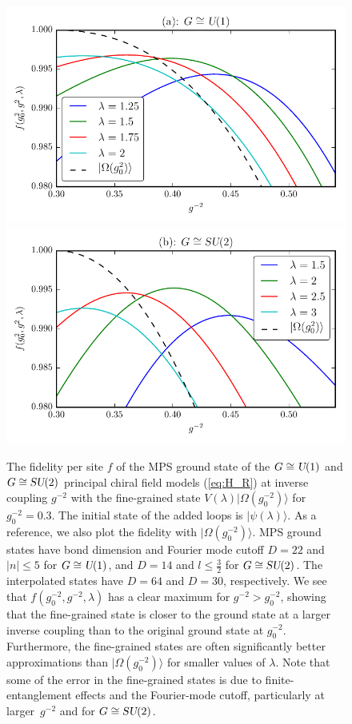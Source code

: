 \documentclass[twocolumn,lengthcheck,superscriptaddress]{revtex4-1}
\def\su2{\textsl{SU}(2)}
\def\uone{\textsl{U}(1)}
\theoremstyle{definition}
\theoremstyle{remark}
\begin{document}
\begin{figure}[ht]
  \includegraphics[width=0.48\linewidth]{interpfidu1.pdf}
  \includegraphics[width=0.48\linewidth]{interpfidsu2.pdf}
  \caption{\label{fig:interp-fid} The fidelity per site $f$ of the 
    MPS ground state of the $G \cong \uone$ and $G \cong \su2$ 
    principal chiral field models (\ref{eq:H_R}) at inverse coupling $g^{-2}$ 
    with the fine-grained state $V(\lambda) |\Omega(g_0^{-2})\rangle$ for
    $g_0^{-2} = 0.3$. The initial state of the added loops is $|\psi(\lambda)\rangle$. 
    As a reference, we also plot the fidelity with $|\Omega(g_0^{-2})\rangle$.
    MPS ground states have bond dimension and Fourier mode cutoff $D=22$ and $|n| \le 5$
    for $G \cong \uone$, and $D=14$ and $l \le \frac{3}{2}$ for $G \cong \su2$. The
    interpolated states have $D=64$ and $D=30$, respectively.
    We see that $f(g_0^{-2}, g^{-2}, \lambda)$ has a clear
    maximum for $g^{-2} > g_0^{-2}$, showing
    that the fine-grained state is closer to the ground state at a larger
    inverse coupling than to the original ground state at $g_0^{-2}$. Furthermore, 
    the fine-grained states are often significantly better approximations than 
    $|\Omega(g_0^{-2})\rangle$ for smaller values of $\lambda$.
    Note that some of the error in the fine-grained states is due to 
    finite-entanglement effects and the Fourier-mode cutoff, particularly
    at larger~$g^{-2}$ and for $G \cong \su2$.
}
\end{figure}
\end{document}
